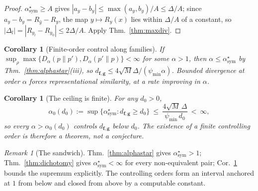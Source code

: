 \documentclass[10pt,letterpaper,twocolumn]{article}
\newcommand{\DONE}[1]{}
\newcommand{\bff}{\mathbf{f}}
\newcommand{\bfg}{\mathbf{g}}
\newcommand{\dfg}{d_{\bff,\bfg}}
\newcommand{\Dalpha}{D_{\alpha}}
\theoremstyle{plain}
\newtheorem{corollary}[theorem]{Corollary}
\theoremstyle{definition}
\theoremstyle{remark}
\newtheorem{remark}[theorem]{Remark}
\begin{document}
\begin{proof}
$\alpha^{\star}_{\mathrm{sym}}\ge A$ gives $|a_{y}-b_{y}|\le
\max(a_{y},b_{y})/A\le\Delta/A$; since $a_{y}-b_{y}=R_{\hat y}-R_{y}$, the map
$y\mapsto R_{y}(x)$ lies within $\Delta/A$ of a constant, so
$|\Delta_{l}|=|R_{y_{l}}-R_{y_{0}}|\le2\Delta/A$. Apply
Thm.~\ref{thm:maxdiv}.
\end{proof}

\begin{corollary}[Finite-order control along families]
\label{cor:finite}
If $\sup_{\rho}\max\{\Dalpha(p\|p'),\Dalpha(p'\|p)\}<\infty$ for some
$\alpha>1$, then $\alpha\le\alpha^{\star}_{\mathrm{sym}}$ by
Thm.~\ref{thm:alphastar}(iii), so
$\dfg\le4\sqrt{M}\Delta/(\psi_{\min}\alpha)$. Bounded divergence at order
$\alpha$ \emph{forces} representational similarity, at a rate improving in
$\alpha$.
\end{corollary}

\begin{corollary}[The ceiling is finite]
\label{cor:ceiling}
For any $d_{0}>0$,
\begin{equation}
\alpha_{0}(d_{0}):=\sup\{\alpha^{\star}_{\mathrm{sym}}:\dfg\ge d_{0}\}
\ \le\ \frac{4\sqrt{M}\,\Delta}{\psi_{\min}\,d_{0}}\ <\ \infty ,
\label{eq:ceiling}
\end{equation}
so every $\alpha>\alpha_{0}(d_{0})$ controls $\dfg$ below $d_{0}$. The
existence of a finite controlling order is therefore a theorem, not a
conjecture.
\end{corollary}

\DONE{$0/67$ violations of Thm.~\ref{thm:graded} and $0/67$ of
Cor.~\ref{cor:ceiling}. The cap is, however, numerically out of reach:
\eqref{eq:ceiling} is below $1$ only for
$\alpha>4\sqrt{M}\Delta/\psi_{\min}$, and the median $\Delta/\psi_{\min}$ on
constructed models is $3.8$--$5.5$, requiring $\alpha$ between $27$ and $46$
against an empirical $\alpha^{\star}_{\mathrm{sym}}$ ceiling near $1.35$. Like
Thm.~\ref{thm:klcond}, Cor.~\ref{cor:ceiling} is correct and explicit but does
not yet bite on models anyone trains.}

\begin{remark}[The sandwich]
\label{rem:sandwich}
Thm.~\ref{thm:alphastar} gives $\alpha^{\star}_{\mathrm{sym}}>1$;
Thm.~\ref{thm:dichotomy} gives $\alpha^{\star}_{\mathrm{sym}}<\infty$ for every
non-equivalent pair; Cor.~\ref{cor:ceiling} bounds the supremum explicitly. The
controlling orders form an interval anchored at $1$ from below and closed from
above by a computable constant.
\end{remark}
\end{document}
